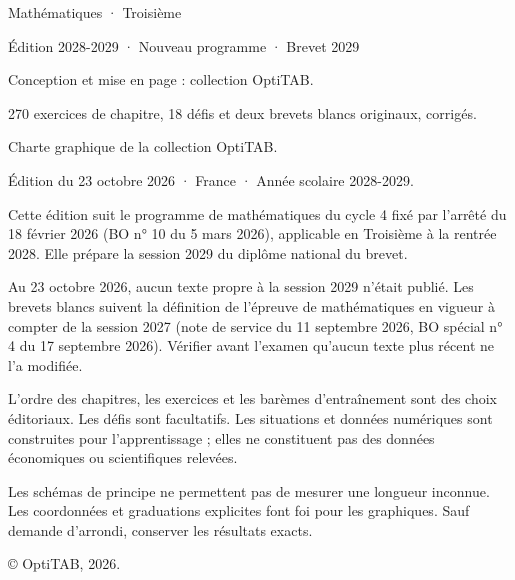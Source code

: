 \thispagestyle{empty}\vspace*{\fill}
\begin{minipage}{128mm}\fontsize{9}{13}\selectfont\color{otMuted}
{\otSemi\color{otInk}Mathématiques · Troisième\par Édition 2028-2029 · Nouveau programme · Brevet 2029}\par\medskip
Conception et mise en page : collection OptiTAB.\par
270 exercices de chapitre, 18 défis et deux brevets blancs originaux, corrigés.\par
Charte graphique de la collection OptiTAB.\par\bigskip
Édition du 23 octobre 2026 · France · Année scolaire 2028-2029.\par\bigskip
Cette édition suit le programme de mathématiques du cycle 4 fixé par l’arrêté
du 18 février 2026 (BO n° 10 du 5 mars 2026), applicable en Troisième à la
rentrée 2028. Elle prépare la session 2029 du diplôme national du brevet.\par\bigskip
Au 23 octobre 2026, aucun texte propre à la session 2029 n’était publié. Les
brevets blancs suivent la définition de l’épreuve de mathématiques en vigueur
à compter de la session 2027 (note de service du 11 septembre 2026, BO spécial
n° 4 du 17 septembre 2026). Vérifier avant l’examen qu’aucun texte plus récent
ne l’a modifiée.\par\bigskip
L’ordre des chapitres, les exercices et les barèmes d’entraînement sont des
choix éditoriaux. Les défis sont facultatifs. Les situations et données
numériques sont construites pour l’apprentissage ; elles ne constituent pas
des données économiques ou scientifiques relevées.\par\bigskip
Les schémas de principe ne permettent pas de mesurer une longueur inconnue.
Les coordonnées et graduations explicites font foi pour les graphiques.
Sauf demande d’arrondi, conserver les résultats exacts.\par\bigskip
© OptiTAB, 2026.\par\otSite
\end{minipage}\clearpage
